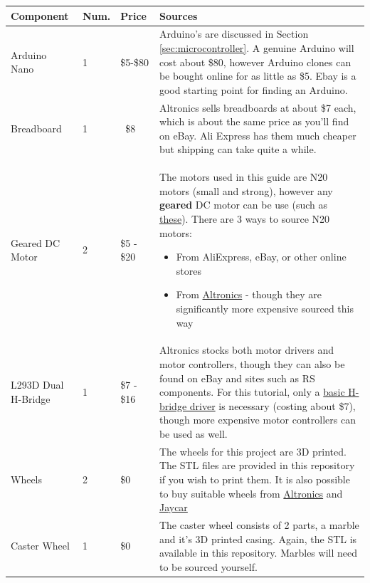 \documentclass[a4paper,12pt]{article}
\begin{document}
    \begin{xltabular}{\linewidth}{p{0.15\textwidth} p{0.05\textwidth} p{0.1\textwidth} X}
        \toprule
        Component & Num. & Price & Sources \\ \midrule
        Arduino Nano & 1 & \$5-\$80 & Arduino's are discussed in Section \ref{sec:microcontroller}. A genuine Arduino will cost about \$80, however Arduino clones can be bought online for as little as \$5. Ebay is a good starting point for finding an Arduino.  \\
        Breadboard & 1 & ~\$8& Altronics sells breadboards at about \$7 each, which is about the same price as you'll find on eBay. Ali Express has them much cheaper but shipping can take quite a while. \\[2cm]
        Geared DC Motor & 2 & \$5 - \$20 & The motors used in this guide are N20 motors (small and strong), however any \textbf{geared} DC motor can be use (such as \href{https://www.jaycar.com.au/dc-geared-motor-with-rubber-wheel/p/YG2900}{these}). There are 3 ways to source N20 motors: \begin{itemize}
            \item From AliExpress, eBay, or other online stores
            \item From \href{https://www.altronics.com.au/p/j0054-micro-m20-geared-motor-150:1-50-200rpm/}{Altronics} - though they are significantly more expensive sourced this way
        \end{itemize} 
        \\
        L293D Dual H-Bridge & 1 & \$7 - \$16&   Altronics stocks both motor drivers and motor controllers, though they can also be found on eBay and sites such as RS components. For this tutorial, only a \href{https://www.altronics.com.au/p/z2900-l293d-motor-drive-ic/}{basic H-bridge driver} is necessary (costing about \$7), though more expensive motor controllers can be used as well. \\[3cm]
        
        Wheels & 2& \$0 & The wheels for this project are 3D printed. The STL files are provided in this repository if you wish to print them. It is also possible to buy suitable wheels from \href{https://www.altronics.com.au/p/j0102-white-plastic-wheel-for-micro-n20-motors/}{Altronics} and \href{https://www.jaycar.com.au/duinotech-micro-wheels-tyres-sold-as-a-pair/p/YG2902}{Jaycar} \\[2cm]

        Caster Wheel & 1 & \$0 & The caster wheel consists of 2 parts, a marble and it's 3D printed casing. Again, the STL is available in this repository. Marbles will need to be sourced yourself. \\[2cm]
        

\end{xltabular}
\end{document}
